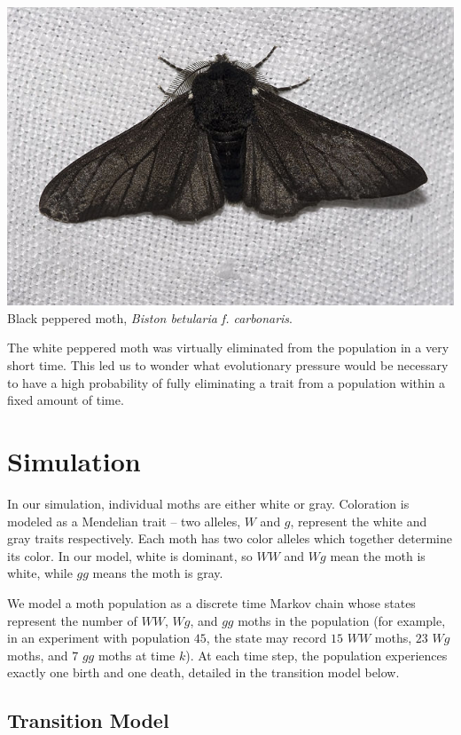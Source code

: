 \documentclass[leqno]{article}
\begin{document}
\begin{center}
\includegraphics{black_peppered_moth.jpg}{\\Black peppered moth, {\it Biston betularia f. carbonaris}.}
\end{center}

The white peppered moth was virtually eliminated from the population in a very short time. This led us to wonder what evolutionary pressure would be necessary to have a high probability of fully eliminating a trait from a population within a fixed amount of time.

\newpage

\section{Simulation}

In our simulation, individual moths are either white or gray. Coloration is modeled as a Mendelian trait -- two alleles, $W$ and $g$, represent the white and gray traits respectively. Each moth has two color alleles which together determine its color. In our model, white is dominant, so $WW$ and $Wg$ mean the moth is white, while $gg$ means the moth is gray.

We model a moth population as a discrete time Markov chain whose states represent the number of $WW$, $Wg$, and $gg$ moths in the population (for example, in an experiment with population $45$, the state may record $15$ $WW$ moths, $23$ $Wg$ moths, and $7$ $gg$ moths at time $k$). At each time step, the population experiences exactly one birth and one death, detailed in the transition model below.

\subsection{Transition Model}
\end{document}
